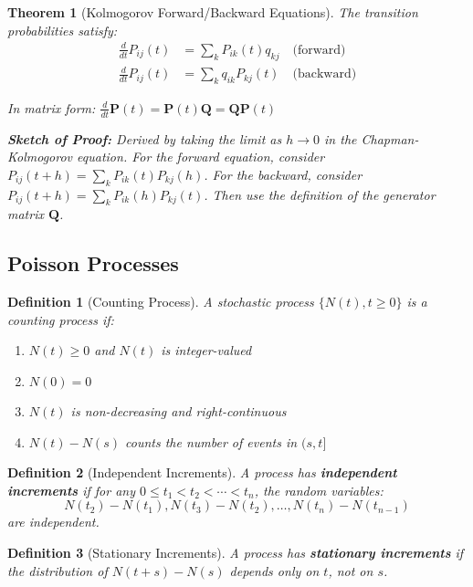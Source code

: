 \documentclass[12pt,a4paper]{article}
\newtheorem{theorem}{Theorem}[section]
\newtheorem{definition}{Definition}[section]
\theoremstyle{remark}
\begin{document}
\begin{theorem}[Kolmogorov Forward/Backward Equations]
The transition probabilities satisfy:
\begin{align}
\frac{d}{dt} P_{ij}(t) &= \sum_k P_{ik}(t) q_{kj} \quad \text{(forward)}\\
\frac{d}{dt} P_{ij}(t) &= \sum_k q_{ik} P_{kj}(t) \quad \text{(backward)}
\end{align}

In matrix form: $\frac{d}{dt} \mathbf{P}(t) = \mathbf{P}(t) \mathbf{Q} = \mathbf{Q} \mathbf{P}(t)$

\textbf{Sketch of Proof:} Derived by taking the limit as $h \to 0$ in the Chapman-Kolmogorov equation. For the forward equation, consider $P_{ij}(t+h) = \sum_k P_{ik}(t)P_{kj}(h)$. For the backward, consider $P_{ij}(t+h) = \sum_k P_{ik}(h)P_{kj}(t)$. Then use the definition of the generator matrix $\mathbf{Q}$.
\end{theorem}

\subsection{Poisson Processes}

\begin{definition}[Counting Process]
A stochastic process $\{N(t), t \geq 0\}$ is a counting process if:
\begin{enumerate}
\item $N(t) \geq 0$ and $N(t)$ is integer-valued
\item $N(0) = 0$
\item $N(t)$ is non-decreasing and right-continuous
\item $N(t) - N(s)$ counts the number of events in $(s,t]$
\end{enumerate}
\end{definition}

\begin{definition}[Independent Increments]
A process has \textbf{independent increments} if for any $0 \leq t_1 < t_2 < \cdots < t_n$, the random variables:
$$N(t_2) - N(t_1), N(t_3) - N(t_2), \ldots, N(t_n) - N(t_{n-1})$$
are independent.
\end{definition}

\begin{definition}[Stationary Increments]
A process has \textbf{stationary increments} if the distribution of $N(t+s) - N(s)$ depends only on $t$, not on $s$.
\end{definition}
\end{document}
